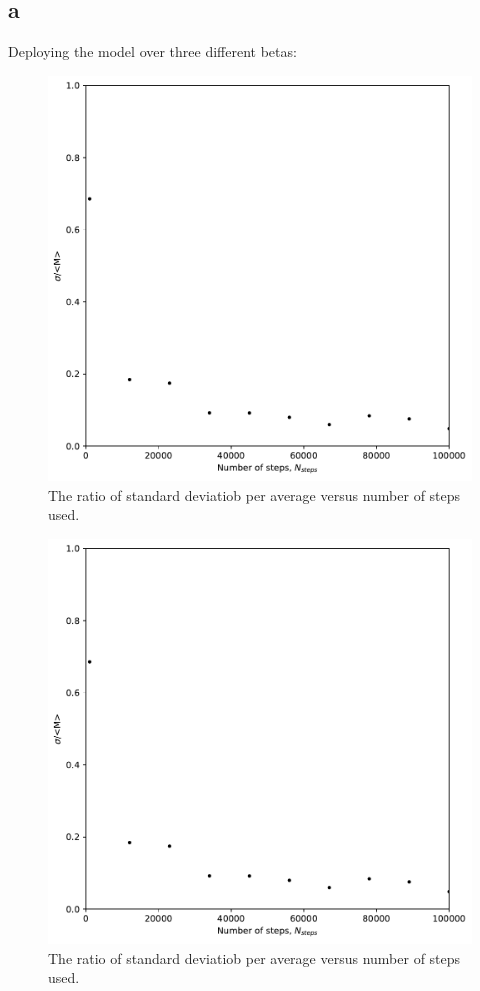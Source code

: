 \documentclass[a4paper]{article}
\theoremstyle{definition}
\begin{document}
\subsection{a}
Deploying the model over three different betas:
\begin{figure}[H]
\centering
\includegraphics[width = 10 cm]{Comp_set_1/Confined_Lattice.pdf}
\caption{The ratio of standard deviatiob per average versus number of steps used.
}
\label{fig:confined_lattice}
\end{figure}  
\begin{figure}[H]
\centering
\includegraphics[width = 10 cm]{Comp_set_1/Confined_Lattice.pdf}
\caption{The ratio of standard deviatiob per average versus number of steps used.
}
\label{fig:confined_lattice}
\end{figure}  
\end{document}
